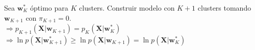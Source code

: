 \documentclass[10pt, a4paper]{article}
\newcommand{\w}{\mathbf{w}}
\newcommand{\X}{\mathbf{X}}
\begin{document}
\begin{minipage}[t]{0.3299\textwidth}
\begin{tcolorbox}[formulabox={Demo: GMM: +K $\implies$ log-lik no decrece}, colframe=softBrown]
    Sea $\w_K^*$ óptimo para $K$ clusters. Construir modelo con $K{+}1$ clusters tomando $\w_{K+1}$ con $\pi_{K+1}=0$.\\
    $\Rightarrow p_{K+1}(\X|\w_{K+1}) = p_K(\X|\w_K^*)$\\
    $\Rightarrow \ln p(\X|\w_{K+1}^*) \geq \ln p(\X|\w_{K+1}) = \ln p(\X|\w_K^*)$
\end{tcolorbox}

\end{minipage}
\end{document}
